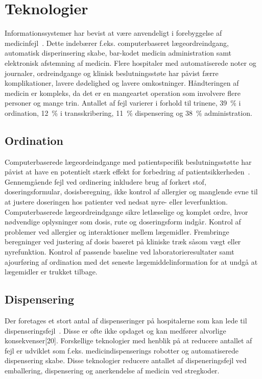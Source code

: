 \chapter{Teknologier}
Informationssystemer har bevist at være anvendeligt i forebyggelse af medicinfejl~\citep{Agrawal2009}. Dette indebærer f.eks. computerbaseret lægeordreindgang, automatisk disperinsering skabe, bar-kodet medicin administration samt elektronisk afstemning af medicin. Flere hospitaler med automatiserede noter og journaler, ordreindgange og klinisk beslutningsstøte har påvist færre komplikationer, lavere dødelighed og lavere omkostninger.  Håndteringen af medicin er kompleks, da det er en mangeartet operation som involvere flere personer og mange trin. Antallet af fejl varierer i forhold til trinene, 39~\% i ordination, 12~\% i transskribering, 11~\% dispensering og 38~\% administration.~\citep{Agrawal2009} 

\section{Ordination}
Computerbaserede lægeordeindgange med patientspecifik beslutningsstøtte har påvist at have en potentielt stærk effekt for forbedring af patientsikkerheden~\citep{Agrawal2009}. Gennemgående fejl ved ordinering inkludere brug af forkert stof, doseringsformular, dosisberegning, ikke kontrol af allergier og manglende evne til at justere doseringen hos patienter ved nedsat nyre- eller leverfunktion.~\citep{Agrawal2009} Computerbaserede lægeordreindgange sikre letlæselige og komplet ordre, hvor nødvendige oplysninger som dosis, rute og doseringsform indgår. Kontrol af problemer ved allergier og interaktioner mellem lægemidler. Frembringe beregninger ved justering af dosis baseret på kliniske træk såsom vægt eller nyrefunktion. Kontrol af passende baseline ved laboratorieresultater samt ajourføring af ordination med det seneste lægemiddelinformation for at undgå at lægemidler er trukket tilbage.~\citep{Agrawal2009}

\section{Dispensering}
Der foretages et stort antal af dispenseringer på hospitalerne som kan lede til dispenseringsfejl~\citep{Agrawal2009}. Disse er ofte ikke opdaget og kan medfører alvorlige konsekvenser[20]. Forskellige teknologier med henblik på at reducere antallet af fejl  er udviklet som f.eks. medicindispenserings robotter og automatiserede dispensering skabe. Disse teknologier reducere antallet af dispeneringsfejl ved emballering, dispensering og anerkendelse af medicin ved stregkoder.~\citep{Agrawal2009}

